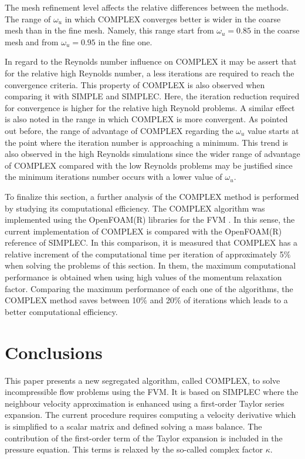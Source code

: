 \documentclass[final,3p,times,11pt,onecolumn]{myElsarticle}
\numberwithin{equation}{section}
\begin{document}
The mesh refinement level affects the relative differences between the methods. The range of $\omega_u$ in which COMPLEX converges better is wider in the coarse mesh than in the fine mesh. Namely, this range start from $\omega_u = 0.85$ in the coarse mesh and from $\omega_u = 0.95$ in the fine one.

In regard to the Reynolds number influence on COMPLEX it may be assert that for the relative high Reynolds number, a less iterations are required to reach the convergence criteria. This property of COMPLEX is also observed when comparing it with SIMPLE and SIMPLEC. Here, the iteration reduction required for convergence is higher for the relative high Reynold problems. A similar effect is also noted in the range in which COMPLEX is more convergent. As pointed out before, the range of advantage of COMPLEX regarding the $\omega_u$ value starts at the point where the iteration number is approaching a minimum. This trend is also observed in the high Reynolds simulations since the wider range of advantage of COMPLEX compared with the low Reynolds problems may be justified since the minimum iterations number occurs with a lower value of $\omega_u$.


To finalize this section, a further analysis of the COMPLEX method is performed by studying its computational efficiency. The  COMPLEX algorithm was implemented using the OpenFOAM(R)  libraries for the FVM \cite{ofpg}. In this sense, the current implementation of COMPLEX is compared with the OpenFOAM(R) reference of SIMPLEC. In this comparison, it is measured that COMPLEX  has a relative increment of the computational time per iteration of approximately 5$\%$ when solving the problems of this section. In them, the maximum computational performance is obtained when using high values of the momentum relaxation factor. Comparing the maximum performance of each one of the algorithms, the COMPLEX method saves between 10$\%$ and 20$\%$ of iterations which leads to a better computational efficiency.


\section{Conclusions}
\label{sec:conclusions}
This paper presents a new segregated algorithm, called COMPLEX, to solve incompressible flow problems using the FVM. It is based on SIMPLEC where the neighbour velocity approximation is enhanced using a first-order Taylor series expansion. The current procedure requires computing a velocity derivative which is simplified to a scalar matrix and defined solving a mass balance. The contribution of the first-order term of the Taylor expansion is included in the pressure equation. This terms is relaxed by the so-called complex factor $\kappa$.  
\end{document}
